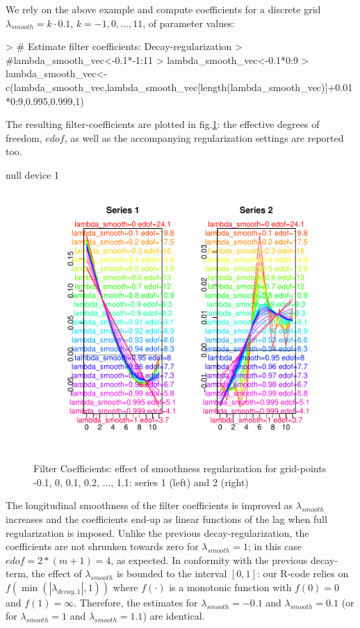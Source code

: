 \documentclass[a4paper]{book}
\begin{document}
We rely on the above example and compute coefficients for a discrete grid $\lambda_{smooth}=k\cdot 0.1$, $k=-1,0,...,11$, of parameter values:  
\begin{Schunk}
\begin{Sinput}
> # Estimate filter coefficients: Decay-regularization
> #lambda_smooth_vec<-0.1*-1:11
> lambda_smooth_vec<-0.1*0:9
> lambda_smooth_vec<-c(lambda_smooth_vec,lambda_smooth_vec[length(lambda_smooth_vec)]+0.01*0:9,0.995,0.999,1)
\end{Sinput}
\end{Schunk}
The resulting filter-coefficients  are plotted in fig.\ref{z_mdfa_ms_reg_smooth_1}: the effective degrees of freedom, $edof$, as well as the accompanying regularization settings are reported too.
\begin{Schunk}
\begin{Soutput}
null device 
          1 
\end{Soutput}
\end{Schunk}
\begin{figure}[H]\begin{center}\includegraphics[height=4in, width=6in]{z_mdfa_ms_reg_smooth_1}\caption{Filter Coefficients: effect of smoothness regularization for grid-points -0.1, 0, 0.1, 0.2, ..., 1.1: series 1 (left) and 2 (right)\label{z_mdfa_ms_reg_smooth_1}}\end{center}\end{figure}The longitudinal smoothness of the filter coefficients is improved as $\lambda_{smooth}$ increases and the coefficients end-up as linear functions of the lag when full regularization is imposed. Unlike the previous decay-regularization, the coefficients are not shrunken towards zero for $\lambda_{smooth}=1$; in this case $edof=2*(m+1)=4$, as expected. In conformity with the previous decay-term, the effect of $\lambda_{smooth}$ is bounded to the interval $[0,1]$: our R-code relies on $f(\min(|\lambda_{decay,1}|,1))$ where $f(\cdot)$ is a monotonic function with $f(0)=0$ and $f(1)=\infty$. Therefore, the estimates for $\lambda_{smooth}=-0.1$ and $\lambda_{smooth}=0.1$ (or for $\lambda_{smooth}=1$ and $\lambda_{smooth}=1.1$) are identical.  
\end{document}
